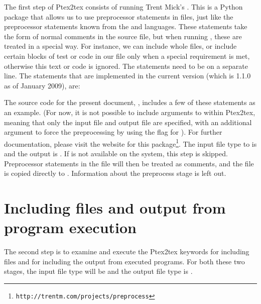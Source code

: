\documentclass[a4paper,11pt]{article}
\begin{document}
The first step of Ptex2tex consists of running Trent Mick's . This is a Python
package that allows us to use preprocessor statements in files, just like the
preprocessor statements known from the  and  languages. These
statements take the form of normal comments in the source file, but when
running , these are treated in a special way. For
instance, we can include whole files, or include certain blocks of
test or code in our file only when a special requirement is met, otherwise this text
or code is ignored. The statements need to be on a
separate line. The statements that are implemented in the current version
(which is 1.1.0 as of January 2009), are:
\begin{itemize}
\item
\code{%
\item
\code{%
\item
\code{%
\item
\code{%
\item
\code{%
\item
\code{%
\item
\code{%
\item
\code{%
\item
\code{%
\item
\code{%
\end{itemize}
The source code for the present document, , includes a few of these
statements as an example. (For now, it is not possible to include arguments to
 within Ptex2tex, meaning that only the input file and output
file are specified, with an additional argument to force the preprocessing
 by using the  flag for ). For further documentation, please
visit the website for this
package\footnote{\texttt{http://trentm.com/projects/preprocess}}. The input file
type to  is  and the output is .  If
 is not available on the system, this step is skipped. Preprocessor
statements in the file will then be treated as comments, and the file is
copied directly to .
Information about the preprocess stage is left out.

\section{Including files and output from program execution}
The second step is to examine and execute the Ptex2tex keywords for
including files and for including the output from executed programs. For both
these two stages, the input file type will be  and the output file
type is .
\end{document}
